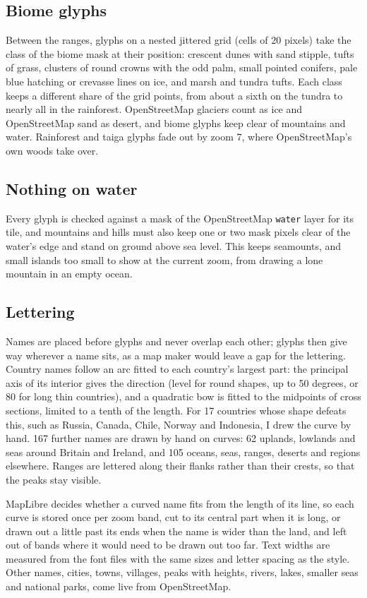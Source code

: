 \documentclass[11pt,a4paper]{article}
\begin{document}
\subsection{Biome glyphs}
Between the ranges, glyphs on a nested jittered grid (cells of 20 pixels) take the class of the biome mask at their position: crescent dunes with sand stipple, tufts of grass, clusters of round crowns with the odd palm, small pointed conifers, pale blue hatching or crevasse lines on ice, and marsh and tundra tufts. Each class keeps a different share of the grid points, from about a sixth on the tundra to nearly all in the rainforest. OpenStreetMap glaciers count as ice and OpenStreetMap sand as desert, and biome glyphs keep clear of mountains and water. Rainforest and taiga glyphs fade out by zoom 7, where OpenStreetMap's own woods take over.

\subsection{Nothing on water}
Every glyph is checked against a mask of the OpenStreetMap \texttt{water} layer for its tile, and mountains and hills must also keep one or two mask pixels clear of the water's edge and stand on ground above sea level. This keeps seamounts, and small islands too small to show at the current zoom, from drawing a lone mountain in an empty ocean.

\subsection{Lettering}
Names are placed before glyphs and never overlap each other; glyphs then give way wherever a name sits, as a map maker would leave a gap for the lettering. Country names follow an arc fitted to each country's largest part: the principal axis of its interior gives the direction (level for round shapes, up to 50 degrees, or 80 for long thin countries), and a quadratic bow is fitted to the midpoints of cross sections, limited to a tenth of the length. For 17 countries whose shape defeats this, such as Russia, Canada, Chile, Norway and Indonesia, I drew the curve by hand. 167 further names are drawn by hand on curves: 62 uplands, lowlands and seas around Britain and Ireland, and 105 oceans, seas, ranges, deserts and regions elsewhere. Ranges are lettered along their flanks rather than their crests, so that the peaks stay visible.

MapLibre decides whether a curved name fits from the length of its line, so each curve is stored once per zoom band, cut to its central part when it is long, or drawn out a little past its ends when the name is wider than the land, and left out of bands where it would need to be drawn out too far. Text widths are measured from the font files with the same sizes and letter spacing as the style. Other names, cities, towns, villages, peaks with heights, rivers, lakes, smaller seas and national parks, come live from OpenStreetMap.
\end{document}
